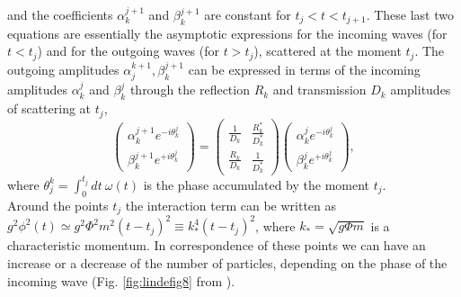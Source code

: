 \documentclass[11pt,a4paper,twoside]{book}
\begin{document}
and the coefficients $ \alpha_{k}^{j+1} $ and $ \beta_{k}^{j+1} $ are constant for $ t_{j}<t<t_{j+1} $. These last two equations are essentially the asymptotic expressions for the incoming waves (for $ t < t_{j} $) and for the outgoing waves (for $ t > t_{j} $), scattered at the moment $ t_{j} $. The outgoing amplitudes $ \alpha_{j}^{k+1}, \beta_{k}^{j+1} $ can be expressed in terms of the incoming amplitudes $ \alpha_{k}^{j} $ and $ \beta_{k}^{j} $ through the reflection $ R_{k} $ and transmission $ D_{k} $ amplitudes  of scattering at $ t_{j} $,
\begin{equation}
	\label{Chap4:ScatteringMatrices}
		\left(
		\begin{array}{c}
			\alpha_{k}^{j+1}e^{-i\theta_{k}^{j}} \\
			\beta_{k}^{j+1}e^{+i\theta_{k}^{j}}
		\end{array}
		\right)
		=
		\left(
		\begin{array}{cc}
			\frac{1}{D_{k}}  & \frac{R_{k}^{*}}{D_{k}^{*}} \\
			\frac{R_{k}}{D_{k}} & \frac{1}{D^{*}_{k}}
		\end{array}
		\right)
		\left(
		\begin{array}{c}
		\alpha_{k}^{j}e^{-i\theta_{k}^{j}}	\\
			\beta_{k}^{j}e^{+i\theta_{k}^{j}}
		\end{array}
		\right),
	\end{equation}
where $ \theta_{j}^{k}=\int_{0}^{t_{j}} dt\ \omega(t)$ is the phase accumulated by the moment $ t_{j} $.\\
Around the points $ t_{j} $ the interaction term can be written as $ g^{2}\phi^{2}(t) \simeq g^{2}\Phi^{2}m^{2}(t-t_{j})^{2} \equiv k_{*}^{4}(t-t_{j})^{2} $, where $ k_{*}=\sqrt{g\Phi m} $ is a characteristic momentum. In correspondence of these points we can have an increase or a decrease of the number of particles, depending on the phase of the incoming wave (Fig. \ref{fig:lindefig8} from \cite{Chap4:LindePreheatingModel}).\\
\end{document}
